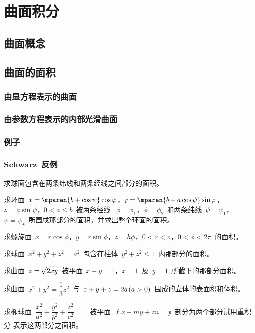 

\chapter{曲面积分}\label{ch:22}

\section{曲面概念}

\section{曲面的面积}
\subsection{由显方程表示的曲面}
\subsection{由参数方程表示的内部光滑曲面}
\subsection{例\emspace 子}
\subsection{Schwarz~反例}
\begin{exercise}
\item 求球面包含在两条纬线和两条经线之间部分的面积。
\item 求环面~$x=\mparen{b+\cos\psi}\cos\phi$，$y=\mparen{b+a\cos\psi}\sin\phi$，$z=a\sin\psi$，$0<a\leq b$~被两条经线
~$\phi=\phi_1$，$\phi=\phi_2$~和两条纬线~$\psi=\psi_1$，$\psi=\psi_2$~所围成那部分的面积，并求出整个环面的面积。
\item 求螺旋面~$x=r\cos\phi$，$y=r\sin\phi$，$z=h\phi$，$0<r<a$，$0<\phi<2\pi$~的面积。
\item 求球面~$x^2+y^2+z^2=a^2$~包含在柱体~$y^2+z^2\leq 1$~内那部分的面积。
\item 求曲面~$z=\smbsqrt{2xy}$~被平面~$x+y=1$，$x=1$~及~$y=1$~所截下的那部分面积。
\item 求曲面~$x^2+y^2=\dfrac13z^2$~与~$x+y+z=2a\mcond{a>0}$~围成的立体的表面积和体积。
\item 求椭球面~$\dfrac{x^2}{a^2}+\dfrac{y^2}{b^2}+\dfrac{z^2}{c^2}=1$~被平面~$\ell x+my+zn=p$~剖分为两个部分试用重积分
表示这两部分之面积。
\end{exercise}

